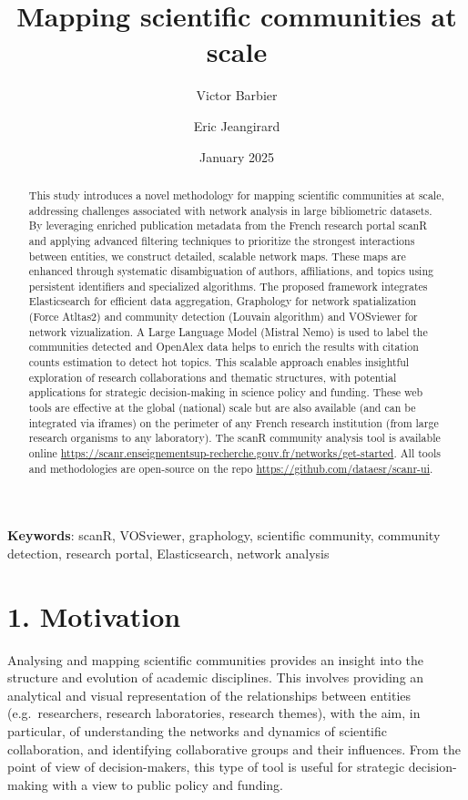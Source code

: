 \documentclass[
]{article}
\title{Mapping scientific communities at scale}
\author[%
  1%
  ]{%
  Victor Barbier%
}
\author[%
  1%
  ]{%
  Eric Jeangirard%
}
\affil[1]{French Ministry of Higher Education and Research, Paris,
France}
\date{January 2025}
\begin{document}
\maketitle
\begin{abstract}
This study introduces a novel methodology for mapping scientific
communities at scale, addressing challenges associated with network
analysis in large bibliometric datasets. By leveraging enriched
publication metadata from the French research portal scanR and applying
advanced filtering techniques to prioritize the strongest interactions
between entities, we construct detailed, scalable network maps. These
maps are enhanced through systematic disambiguation of authors,
affiliations, and topics using persistent identifiers and specialized
algorithms. The proposed framework integrates Elasticsearch for
efficient data aggregation, Graphology for network spatialization (Force
Atltas2) and community detection (Louvain algorithm) and VOSviewer for
network vizualization. A Large Language Model (Mistral Nemo) is used to
label the communities detected and OpenAlex data helps to enrich the
results with citation counts estimation to detect hot topics. This
scalable approach enables insightful exploration of research
collaborations and thematic structures, with potential applications for
strategic decision-making in science policy and funding. These web tools
are effective at the global (national) scale but are also available (and
can be integrated via iframes) on the perimeter of any French research
institution (from large research organisms to any laboratory). The scanR
community analysis tool is available online
\url{https://scanr.enseignementsup-recherche.gouv.fr/networks/get-started}.
All tools and methodologies are open-source on the repo
\url{https://github.com/dataesr/scanr-ui}.
\end{abstract}

\textbf{Keywords}: scanR, VOSviewer, graphology, scientific community,
community detection, research portal, Elasticsearch, network analysis

\hypertarget{motivation}{%
\section{1. Motivation}\label{motivation}}

Analysing and mapping scientific communities provides an insight into
the structure and evolution of academic disciplines. This involves
providing an analytical and visual representation of the relationships
between entities (e.g.~researchers, research laboratories, research
themes), with the aim, in particular, of understanding the networks and
dynamics of scientific collaboration, and identifying collaborative
groups and their influences. From the point of view of decision-makers,
this type of tool is useful for strategic decision-making with a view to
public policy and funding.
\end{document}
